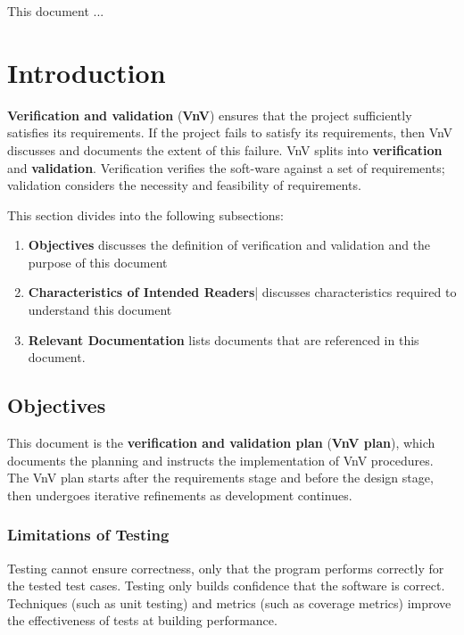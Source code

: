 \documentclass[12pt, titlepage]{article}
\begin{document}

\newpage


This document ... 

\section{Introduction}

\textbf{Verification and validation} (\textbf{VnV}) ensures that the project sufficiently satisfies its requirements. If the project fails to satisfy its requirements, then VnV discusses and documents the extent of this failure.
VnV splits into \textbf{verification} and \textbf{validation}. Verification verifies the soft-ware against a set of requirements; validation considers the necessity and feasibility of requirements.

This section divides into the following subsections:
\begin{enumerate}
  \item \textbf{Objectives} discusses the definition of verification and validation and the purpose of this document
  \item \textbf{Characteristics of Intended Readers}| discusses characteristics required to understand this document
  \item \textbf{Relevant Documentation} lists documents that are referenced in this document.
\end{enumerate}

\subsection{Objectives}
\label{subsec:objectives}
This document is the \textbf{verification and validation plan} (\textbf{VnV plan}), which documents the planning and instructs the implementation of VnV procedures. The VnV plan starts after the requirements stage and before the design stage, then undergoes iterative refinements as development continues.


\subsubsection{Limitations of Testing}
\label{subsubsec:limitations}
Testing cannot ensure correctness, only that the program performs correctly for the tested test cases. Testing only builds confidence that the software is correct. Techniques (such as unit testing) and metrics (such as coverage metrics) improve the effectiveness of tests at building performance.
\end{document}
